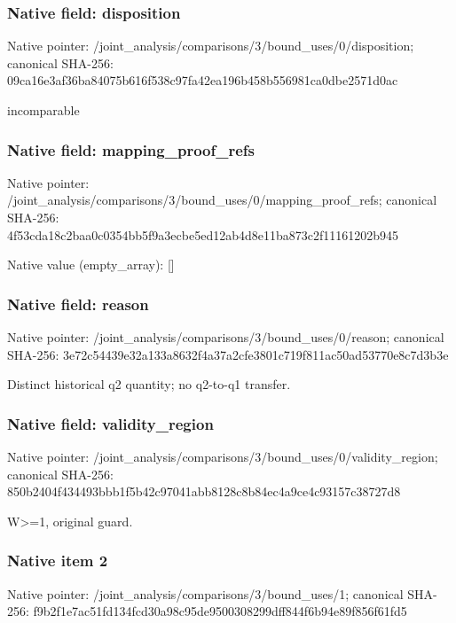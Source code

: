 \documentclass[10pt,a4paper]{article}
\begin{document}
\subsubsection{Native field: disposition}
Native pointer: /joint\_\allowbreak{}analysis/comparisons/3/bound\_\allowbreak{}uses/0/disposition; canonical SHA-256: 09ca16e3af36ba84075b616f538c97fa42ea196b458b556981ca0dbe2571d0ac

\begingroup\raggedright\sloppy incomparable\par\endgroup

\subsubsection{Native field: mapping\_\allowbreak{}proof\_\allowbreak{}refs}
Native pointer: /joint\_\allowbreak{}analysis/comparisons/3/bound\_\allowbreak{}uses/0/mapping\_\allowbreak{}proof\_\allowbreak{}refs; canonical SHA-256: 4f53cda18c2baa0c0354bb5f9a3ecbe5ed12ab4d8e11ba873c2f11161202b945

Native value (empty\_\allowbreak{}array): []

\subsubsection{Native field: reason}
Native pointer: /joint\_\allowbreak{}analysis/comparisons/3/bound\_\allowbreak{}uses/0/reason; canonical SHA-256: 3e72c54439e32a133a8632f4a37a2cfe3801c719f811ac50ad53770e8c7d3b3e

\begingroup\raggedright\sloppy Distinct historical q2 quantity;\allowbreak{} no q2-to-q1 transfer.\par\endgroup

\subsubsection{Native field: validity\_\allowbreak{}region}
Native pointer: /joint\_\allowbreak{}analysis/comparisons/3/bound\_\allowbreak{}uses/0/validity\_\allowbreak{}region; canonical SHA-256: 850b2404f434493bbb1f5b42c97041abb8128c8b84ec4a9ce4c93157c38727d8

\begingroup\raggedright\sloppy W>=\allowbreak{}1,\allowbreak{} original guard.\par\endgroup

\subsubsection{Native item 2}
Native pointer: /joint\_\allowbreak{}analysis/comparisons/3/bound\_\allowbreak{}uses/1; canonical SHA-256: f9b2f1e7ac51fd134fcd30a98c95de9500308299dff844f6b94e89f856f61fd5
\end{document}
